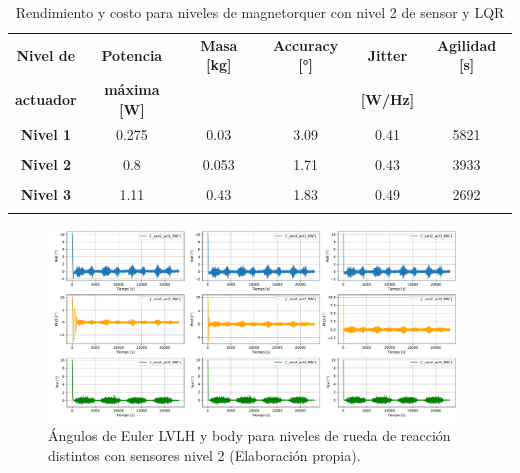 \begin{table}[h!]
	\centering
	\caption{Rendimiento y costo para niveles de magnetorquer con nivel 2 de sensor y LQR}
	\begin{tabular}{|c|c|c|c|c|c|}
		\hline
		\textbf{Nivel de}   & \textbf{Potencia} & \textbf{Masa [kg]} & \textbf{Accuracy [°]} & \textbf{Jitter} & \textbf{Agilidad [s]}  \\ 
		\textbf{actuador}  & \textbf{máxima [W]} & & & \textbf{[W/Hz]} &  \\
		\hline
		\textbf{Nivel 1}   & 0.275  &  0.03  & 3.09 &  0.41 & 5821   \\
		&  &   &  &  &    \\
		\hline
		\textbf{Nivel 2}   & 0.8  & 0.053  & 1.71 & 0.43 & 3933   \\
		& & & & &   \\
		\hline
		\textbf{Nivel 3}   & 1.11  & 0.43  & 1.83 & 0.49 & 2692   \\
		& & & & &   \\
		\hline		
	\end{tabular}
	\label{tab:MT_LQR_actuadores}
\end{table}

\begin{figure}[H]
	\centering    
	\includegraphics[width=0.97\textwidth]{RW_LQR_actuadores.pdf}
	\caption{Ángulos de Euler LVLH y body para niveles de rueda de reacción distintos con sensores nivel 2 (Elaboración propia).}
	\label{fig:RW_LQR_actuadores}
\end{figure}


